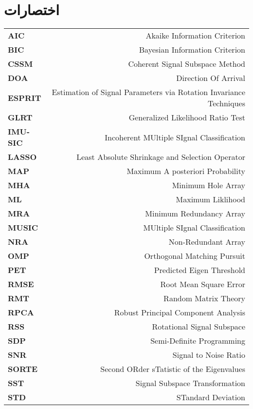\section*{اختصارات}
\begin{latin}
\begin{center}
\begin{tabular*}{\textwidth}{@{\extracolsep{\fill} }>{\bfseries}lr}
 {AIC}&  Akaike Information Criterion\\
 {BIC}&  Bayesian Information Criterion\\
 {CSSM}&  Coherent Signal Subspace Method\\
 {DOA}&  Direction Of Arrival\\
 {ESPRIT}&  Estimation of Signal Parameters via Rotation Invariance Techniques\\
 {GLRT}&  Generalized Likelihood Ratio Test\\
 {IMUSIC}&  Incoherent MUltiple SIgnal Classification\\
 {LASSO}&  Least Absolute Shrinkage and Selection Operator\\
 {MAP}&  Maximum A posteriori Probability\\
 {MHA}&  Minimum Hole Array\\
 {ML}&  Maximum Liklihood\\
 {MRA}&  Minimum Redundancy Array\\
 {MUSIC}&  MUltiple SIgnal Classification\\
 {NRA}&  Non-Redundant Array\\
 {OMP}&  Orthogonal Matching Pursuit\\
 {PET}&  Predicted Eigen Threshold\\
 {RMSE}&  Root Mean Square Error\\
 {RMT}&  Random Matrix Theory\\
 {RPCA}&  Robust Principal Component Analysis\\
 {RSS}&  Rotational Signal Subspace\\
 {SDP}&  Semi-Definite Programming\\
 {SNR}&  Signal to Noise Ratio\\
 {SORTE}&  Second ORder sTatistic of the Eigenvalues\\
 {SST}&  Signal Subspace Transformation\\
 {STD}&  STandard Deviation\\
\end{tabular*}
\end{center}
\end{latin}

